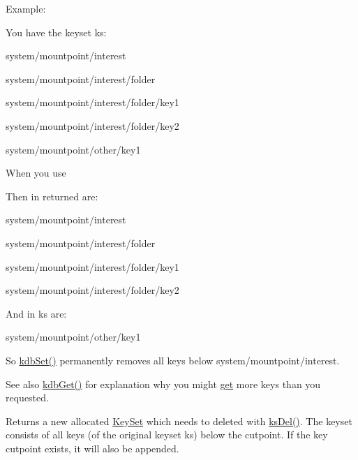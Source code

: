 \begin{DoxyParagraph}{Example\+:}

\end{DoxyParagraph}
You have the keyset {\ttfamily ks\+:} 
\begin{DoxyItemize}
\item {\ttfamily system/mountpoint/interest} 
\item {\ttfamily system/mountpoint/interest/folder} 
\item {\ttfamily system/mountpoint/interest/folder/key1} 
\item {\ttfamily system/mountpoint/interest/folder/key2} 
\item {\ttfamily system/mountpoint/other/key1} 
\end{DoxyItemize}

When you use 
\begin{DoxyCodeInclude}
\end{DoxyCodeInclude}
 Then in {\ttfamily returned} are\+:
\begin{DoxyItemize}
\item {\ttfamily system/mountpoint/interest} 
\item {\ttfamily system/mountpoint/interest/folder} 
\item {\ttfamily system/mountpoint/interest/folder/key1} 
\item {\ttfamily system/mountpoint/interest/folder/key2} 
\end{DoxyItemize}

And in {\ttfamily ks} are\+:
\begin{DoxyItemize}
\item {\ttfamily system/mountpoint/other/key1} 
\end{DoxyItemize}

So \hyperlink{group__kdb_ga11436b058408f83d303ca5e996832bcf}{kdb\+Set()} permanently removes all keys below {\ttfamily system/mountpoint/interest}.

\begin{DoxySeeAlso}{See also}
\hyperlink{group__kdb_ga28e385fd9cb7ccfe0b2f1ed2f62453a1}{kdb\+Get()} for explanation why you might \hyperlink{classkdb_1_1KeySet_ad0b7d6498cf0b51ca6672704939a7f24}{get} more keys than you requested.
\end{DoxySeeAlso}
\begin{DoxyReturn}{Returns}
a new allocated \hyperlink{classkdb_1_1KeySet}{Key\+Set} which needs to deleted with \hyperlink{group__keyset_ga27e5c16473b02a422238c8d970db7ac8}{ks\+Del()}. The keyset consists of all keys (of the original keyset ks) below the cutpoint. If the key cutpoint exists, it will also be appended. 
\end{DoxyReturn}

